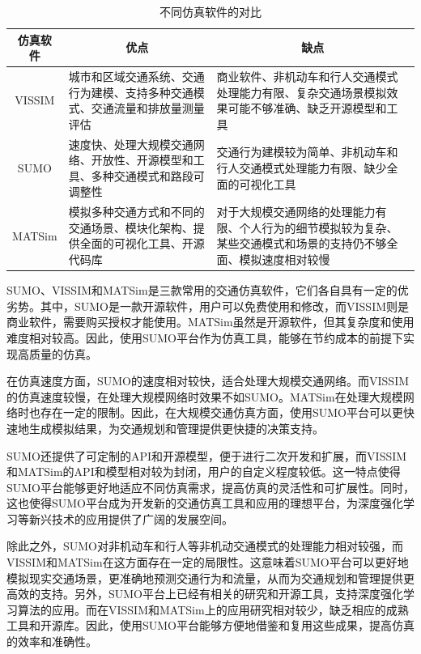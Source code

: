 \renewcommand{\arraystretch}{1.5} %
\begin{table}[htbp]
\centering
\caption{不同仿真软件的对比}
\label{tab:3_1}
\begin{tabular}{cll}
\toprule
仿真软件 & \multicolumn{1}{c}{优点}       & \multicolumn{1}{c}{缺点}     \\
\midrule
VISSIM                       & \parbox[t]{5.5cm}{城市和区域交通系统、交通行为建模、支持多种交通模式、交通流量和排放量测量评估}      & \parbox[t]{5.5cm}{商业软件、非机动车和行人交通模式处理能力有限、复杂交通场景模拟效果可能不够准确、缺乏开源模型和工具 }                       \\
SUMO                      & \parbox[t]{5.5cm}{速度快、处理大规模交通网络、开放性、开源模型和工具、多种交通模式和路段可调整性}    & \parbox[t]{5.5cm}{交通行为建模较为简单、非机动车和行人交通模式处理能力有限、缺少全面的可视化工具}              \\ 
MATSim                    & \parbox[t]{5.5cm}{模拟多种交通方式和不同的交通场景、模块化架构、提供全面的可视化工具、开源代码库}   & \parbox[t]{5.5cm}{对于大规模交通网络的处理能力有限、个人行为的细节模拟较为复杂、某些交通模式和场景的支持仍不够全面、模拟速度相对较慢}              \\
\bottomrule
\end{tabular}
\end{table}


SUMO、VISSIM和MATSim是三款常用的交通仿真软件，它们各自具有一定的优劣势。其中，SUMO是一款开源软件，用户可以免费使用和修改，而VISSIM则是商业软件，需要购买授权才能使用。MATSim虽然是开源软件，但其复杂度和使用难度相对较高。因此，使用SUMO平台作为仿真工具，能够在节约成本的前提下实现高质量的仿真。

在仿真速度方面，SUMO的速度相对较快，适合处理大规模交通网络。而VISSIM的仿真速度较慢，在处理大规模网络时效果不如SUMO。MATSim在处理大规模网络时也存在一定的限制。因此，在大规模交通仿真方面，使用SUMO平台可以更快速地生成模拟结果，为交通规划和管理提供更快捷的决策支持。

SUMO还提供了可定制的API和开源模型，便于进行二次开发和扩展，而VISSIM和MATSim的API和模型相对较为封闭，用户的自定义程度较低。这一特点使得SUMO平台能够更好地适应不同仿真需求，提高仿真的灵活性和可扩展性。同时，这也使得SUMO平台成为开发新的交通仿真工具和应用的理想平台，为深度强化学习等新兴技术的应用提供了广阔的发展空间。

除此之外，SUMO对非机动车和行人等非机动交通模式的处理能力相对较强，而VISSIM和MATSim在这方面存在一定的局限性。这意味着SUMO平台可以更好地模拟现实交通场景，更准确地预测交通行为和流量，从而为交通规划和管理提供更高效的支持。另外，SUMO平台上已经有相关的研究和开源工具，支持深度强化学习算法的应用。而在VISSIM和MATSim上的应用研究相对较少，缺乏相应的成熟工具和开源库。因此，使用SUMO平台能够方便地借鉴和复用这些成果，提高仿真的效率和准确性。

